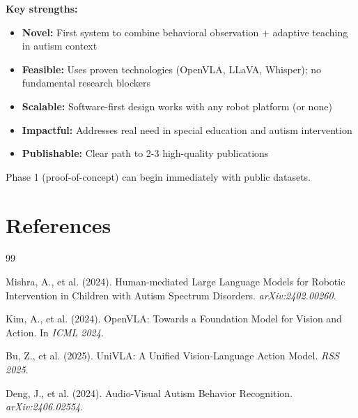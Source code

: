 \documentclass[12pt, a4paper]{article}
\begin{document}
\textbf{Key strengths:}
\begin{itemize}
    \item \textbf{Novel:} First system to combine behavioral observation + adaptive teaching in autism context
    \item \textbf{Feasible:} Uses proven technologies (OpenVLA, LLaVA, Whisper); no fundamental research blockers
    \item \textbf{Scalable:} Software-first design works with any robot platform (or none)
    \item \textbf{Impactful:} Addresses real need in special education and autism intervention
    \item \textbf{Publishable:} Clear path to 2-3 high-quality publications
\end{itemize}

Phase 1 (proof-of-concept) can begin immediately with public datasets.

\newpage

\section*{References}

\begin{thebibliography}{99}

 Mishra, A., et al. (2024). Human-mediated Large Language Models for Robotic Intervention in Children with Autism Spectrum Disorders. \textit{arXiv:2402.00260}.

 Kim, A., et al. (2024). OpenVLA: Towards a Foundation Model for Vision and Action. In \textit{ICML 2024}.

 Bu, Z., et al. (2025). UniVLA: A Unified Vision-Language Action Model. \textit{RSS 2025}.

 Deng, J., et al. (2024). Audio-Visual Autism Behavior Recognition. \textit{arXiv:2406.02554}.

\end{thebibliography}
\end{document}
